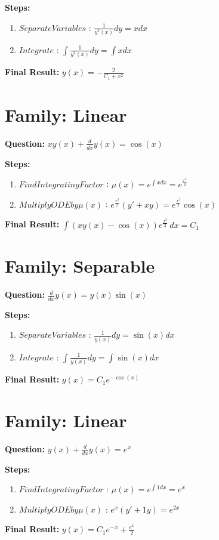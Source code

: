 \documentclass{article}
\begin{document}
\textbf{Steps:}
\begin{enumerate}
\item $Separate Variables$ :  $\frac{1}{y^{2}{\left(x \right)}} dy = x dx$
\item $Integrate$ :  $\int \frac{1}{y^{2}{\left(x \right)}} dy = \int x dx$
\end{enumerate}
\textbf{Final Result:} $y{\left(x \right)} = - \frac{2}{C_{1} + x^{2}}$

\section*{Family: Linear}
\textbf{Question:} $x y{\left(x \right)} + \frac{d}{d x} y{\left(x \right)} = \cos{\left(x \right)}$

\textbf{Steps:}
\begin{enumerate}
\item $Find Integrating Factor$ :  $\mu(x) = e^{\int x dx} = e^{\frac{x^{2}}{2}}$
\item $Multiply ODE by \mu(x)$ :  $e^{\frac{x^{2}}{2}}(y' + xy) = e^{\frac{x^{2}}{2}} \cos{\left(x \right)}$
\end{enumerate}
\textbf{Final Result:} $\int \left(x y{\left(x \right)} - \cos{\left(x \right)}\right) e^{\frac{x^{2}}{2}}\, dx = C_{1}$

\section*{Family: Separable}
\textbf{Question:} $\frac{d}{d x} y{\left(x \right)} = y{\left(x \right)} \sin{\left(x \right)}$

\textbf{Steps:}
\begin{enumerate}
\item $Separate Variables$ :  $\frac{1}{y{\left(x \right)}} dy = \sin{\left(x \right)} dx$
\item $Integrate$ :  $\int \frac{1}{y{\left(x \right)}} dy = \int \sin{\left(x \right)} dx$
\end{enumerate}
\textbf{Final Result:} $y{\left(x \right)} = C_{1} e^{- \cos{\left(x \right)}}$

\section*{Family: Linear}
\textbf{Question:} $y{\left(x \right)} + \frac{d}{d x} y{\left(x \right)} = e^{x}$

\textbf{Steps:}
\begin{enumerate}
\item $Find Integrating Factor$ :  $\mu(x) = e^{\int 1 dx} = e^{x}$
\item $Multiply ODE by \mu(x)$ :  $e^{x}(y' + 1y) = e^{2 x}$
\end{enumerate}
\textbf{Final Result:} $y{\left(x \right)} = C_{1} e^{- x} + \frac{e^{x}}{2}$
\end{document}
